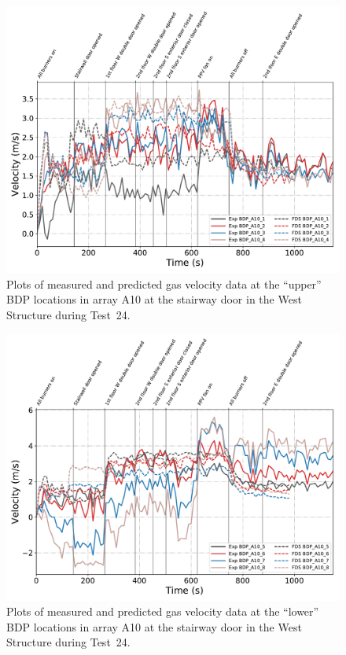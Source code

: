 \begin{figure}[!h]
	\centering
	\includegraphics[width=\columnwidth]{Figures/Plots/Validation/Velocity/Test_24_BDP_A10_upper}
	\caption[Plots of measured and predicted gas velocity data at ``upper'' BDP locations in A10 during Test~24.]{Plots of measured and predicted gas velocity data at the ``upper'' BDP locations in array A10 at the stairway door in the West Structure during Test~24.}
	\label{fig:Test24_upper_BDPs}
\end{figure}

\begin{figure}[!h]
	\centering
	\includegraphics[width=\columnwidth]{Figures/Plots/Validation/Velocity/Test_24_BDP_A10_lower}
	\caption[Plots of measured and predicted gas velocity data at ``lower'' BDP locations in A10 during Test~24.]{Plots of measured and predicted gas velocity data at the ``lower'' BDP locations in array A10 at the stairway door in the West Structure during Test~24.}
	\label{fig:Test24_lower_BDPs}
\end{figure}

